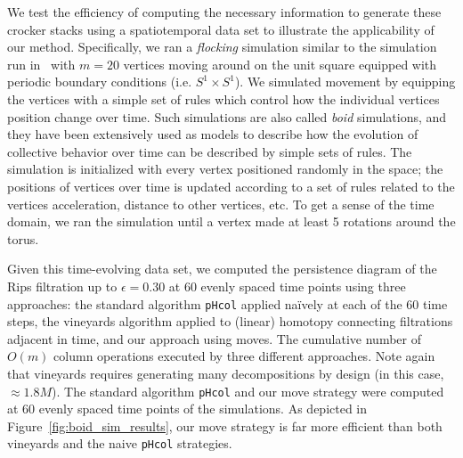 \documentclass[sn-mathphys]{sn-jnl}
\begin{document}

We test the efficiency of computing the necessary information to generate these crocker stacks using a spatiotemporal data set to illustrate the applicability of our method. Specifically, we ran a \emph{flocking} simulation similar to the simulation run in~\cite{topaz2015topological} with $m = 20$ vertices moving around on the unit square equipped with periodic boundary conditions (i.e. $S^1 \times S^1$). We simulated movement by equipping the vertices with a simple set of rules which control how the individual vertices position change over time. Such simulations are also called \emph{boid} simulations, and they have been extensively used as models to describe how the evolution of collective behavior over time can be described by simple sets of rules.
The simulation is initialized with every vertex positioned randomly in the space; the positions of vertices over time is updated according to a set of rules related to the vertices acceleration, distance to other vertices, etc. To get a sense of the time domain, we ran the simulation until a vertex made at least 5 rotations around the torus. 

Given this time-evolving data set, we computed the persistence diagram of the Rips filtration up to $\epsilon = 0.30$ at 60 evenly spaced time points using three approaches: the standard algorithm \texttt{pHcol} applied naïvely at each of the 60 time steps, the vineyards algorithm applied to (linear) homotopy connecting filtrations adjacent in time, and our approach using moves.   
The cumulative number of $O(m)$ column operations executed by three different approaches. Note again that vineyards requires generating many decompositions by design (in this case, $\approx 1.8M$). The standard algorithm \texttt{pHcol} and our move strategy were computed at 60 evenly spaced time points of the simulations. As depicted in Figure~\ref{fig:boid_sim_results}, our move strategy is far more efficient than both vineyards and the naive \texttt{pHcol} strategies. 
\end{document}
